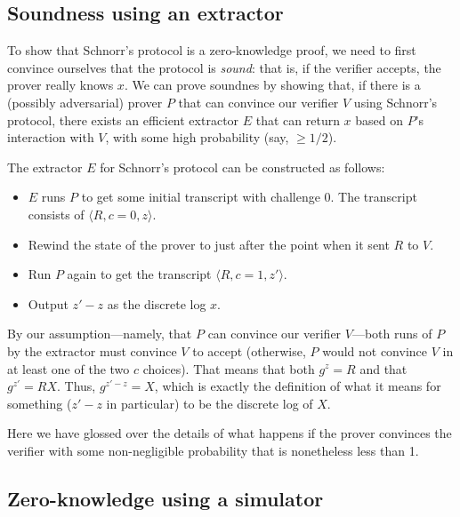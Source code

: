\subsection{Soundness using an extractor}

To show that Schnorr's protocol is a zero-knowledge proof, we need to
first convince ourselves that the protocol is \emph{sound}: that is,
if the verifier accepts, the prover really knows $x$.  We can prove
soundnes by showing that, if there is a (possibly adversarial) prover
$P$ that can convince our verifier $V$ using Schnorr's protocol, there
exists an efficient extractor $E$ that can return $x$ based on $P$'s
interaction with $V$, with some high probability (say, $\ge 1/2$).

The extractor $E$ for Schnorr's protocol can be constructed as follows:

\begin{itemize}

\item $E$ runs $P$ to get some initial transcript with challenge 0.
  The transcript consists of $\langle R, c=0, z\rangle$.

\item Rewind the state of the prover to just after the point when it
  sent $R$ to $V$.

\item Run $P$ again to get the transcript $\langle R, c=1, z'\rangle$.

\item Output $z'-z$ as the discrete log $x$.

\end{itemize}

By our assumption---namely, that $P$ can convince our verifier $V$---both
runs of $P$ by the extractor must convince $V$ to accept (otherwise,
$P$ would not convince $V$ in at least one of the two $c$ choices).
That means that both $g^z=R$ and that $g^{z'}=RX$.  Thus, $g^{z'-z}=X$,
which is exactly the definition of what it means for something ($z'-z$
in particular) to be the discrete log of $X$.

Here we have glossed over the details of what happens if the prover
convinces the verifier with some non-negligible probability that is
nonetheless less than 1.


\subsection{Zero-knowledge using a simulator}

